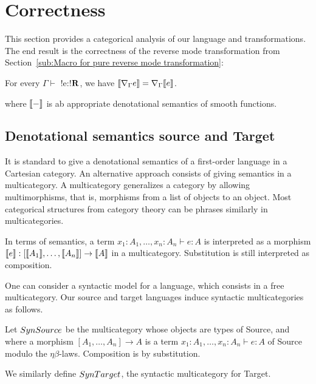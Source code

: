 \section{Correctness}
\label{sec:correctness}

This section provides a categorical analysis of our language and transformations.
The end result is the correctness of the reverse mode transformation from Section~\ref{sub:Macro for pure reverse mode transformation}:

 \begin{theorem}
     For every $\Gamma \vdash$ !e:!$\mathbf{R}$, we have 
     $\llbracket \nabla_\Gamma e\rrbracket= \nabla_\Gamma\llbracket e\rrbracket$.
 \end{theorem}
where $\llbracket -\rrbracket$ is ab appropriate denotational semantics of smooth functions.

\subsection{Denotational semantics source and Target} %
\label{sub:Denotational semantics source and Target}

It is standard to give a denotational semantics of a first-order language in a Cartesian category.
An alternative approach consists of giving semantics in a multicategory.
A multicategory generalizes a category by allowing multimorphisms, that is, morphisms from a list of objects to an object.
Most categorical structures from category theory can be phrases similarly in multicategories.

In terms of semantics, a term $x_1:A_1,\ldots,x_n:A_n\vdash e:A$ is interpreted as a morphism $\llbracket e\rrbracket:[\llbracket A_1\rrbracket,\ldots,\llbracket A_n\rrbracket]\to \llbracket A\rrbracket$ in a multicategory.
Substitution is still interpreted as composition. 

One can consider a syntactic model for a language, which consists in a free multicategory.
Our source and target languages induce syntactic multicategories as follows.

\begin{definition}
    Let $SynSource$ be the multicategory whose objects are types of Source, and where a morphism 
    $[A_1,\ldots,A_n]\to A$ is a term $x_1:A_1,\ldots,x_n:A_n\vdash e:A$ of Source modulo the $\eta\beta$-laws.
    Composition is by substitution.
\end{definition}

We similarly define $SynTarget$, the syntactic multicategory for Target.

